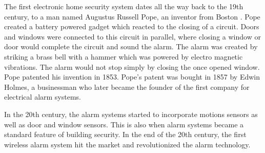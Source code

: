 The first electronic home security system dates all the way back to the 19th century, to a man named Augustus Russell Pope, an inventor from Boston \cite{securityhistory}. Pope created a battery powered gadget which reacted to the closing of a circuit. Doors and windows were connected to this circuit in parallel, where closing a window or door would complete the circuit and sound the alarm. The alarm was created by striking a brass bell with a hammer which was powered by electro magnetic vibrations. The alarm would not stop simply by closing the once opened window. Pope patented his invention in 1853. Pope's patent was bought in 1857 by Edwin Holmes, a businessman who later became the founder of the first company for electrical alarm systems.

In the 20th century, the alarm systems started to incorporate motions sensors as well as door and window sensors. This is also when alarm systems became a standard feature of building security. In the end of the 20th century, the first wireless alarm system hit the market and revolutionized the alarm technology. 
